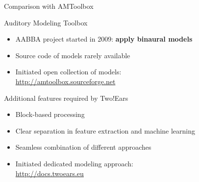 \documentclass{beamer}
\begin{document}
\begin{frame}{Comparison with AMToolbox}

    \vspace{0.3cm}

    Auditory Modeling Toolbox
    \vspace{0.1cm}
    \begin{itemize}
        \item AABBA project started in 2009: \textbf{apply binaural models}
        \item Source code of models rarely available
        \item Initiated open collection of models: \\
            {\small\url{http://amtoolbox.sourceforge.net}}
    \end{itemize}

    \vspace{0.6cm}

    Additional features required by Two!Ears
    \vspace{0.1cm}
    \begin{itemize}
        \item Block-based processing
        \item Clear separation in feature extraction and machine learning
        \item Seamless combination of different approaches
        \item Initiated dedicated modeling approach: \\
            {\small\url{http://docs.twoears.eu}}
    \end{itemize}

\end{frame}
\end{document}
